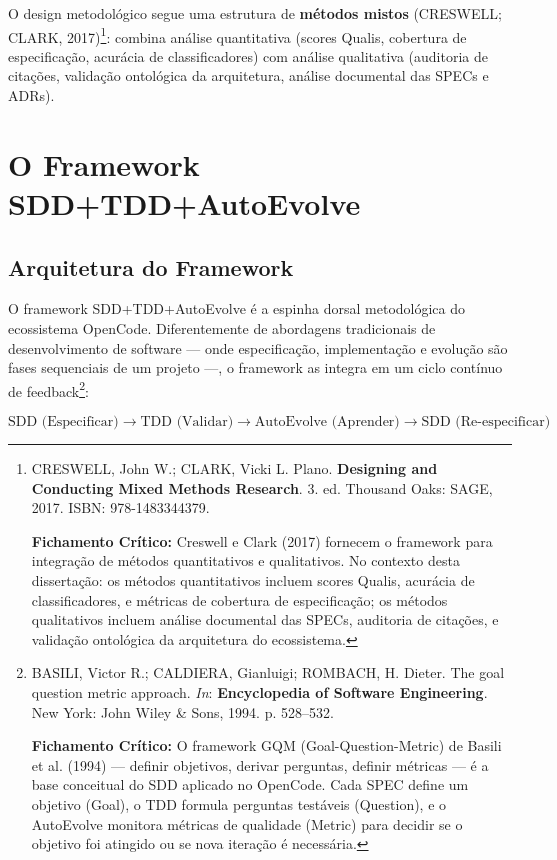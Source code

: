 O design metodológico segue uma estrutura de \textbf{métodos mistos} (CRESWELL; CLARK, 2017)\footnote{
  CRESWELL, John W.; CLARK, Vicki L. Plano. \textbf{Designing and Conducting Mixed Methods Research}. 3. ed. Thousand Oaks: SAGE, 2017. ISBN: 978-1483344379.

  \textbf{Fichamento Crítico:} Creswell e Clark (2017) fornecem o framework para integração de métodos quantitativos e qualitativos. No contexto desta dissertação: os métodos quantitativos incluem scores Qualis, acurácia de classificadores, e métricas de cobertura de especificação; os métodos qualitativos incluem análise documental das SPECs, auditoria de citações, e validação ontológica da arquitetura do ecossistema.
}: combina análise quantitativa (scores Qualis, cobertura de especificação, acurácia de classificadores) com análise qualitativa (auditoria de citações, validação ontológica da arquitetura, análise documental das SPECs e ADRs).

\section{O Framework SDD+\-TDD+\-Auto\-Evolve}

\subsection{Arquitetura do Framework}

O framework SDD+\-TDD+\-Auto\-Evolve é a espinha dorsal metodológica do ecossistema OpenCode. Diferentemente de abordagens tradicionais de desenvolvimento de software --- onde especificação, implementação e evolução são fases sequenciais de um projeto ---, o framework as integra em um ciclo contínuo de feedback\footnote{
  BASILI, Victor R.; CALDIERA, Gianluigi; ROMBACH, H. Dieter. The goal question metric approach. \textit{In}: \textbf{Encyclopedia of Software Engineering}. New York: John Wiley \& Sons, 1994. p. 528--532.

  \textbf{Fichamento Crítico:} O framework GQM (Goal-Question-Metric) de Basili et al. (1994) --- definir objetivos, derivar perguntas, definir métricas --- é a base conceitual do SDD aplicado no OpenCode. Cada SPEC define um objetivo (Goal), o TDD formula perguntas testáveis (Question), e o AutoEvolve monitora métricas de qualidade (Metric) para decidir se o objetivo foi atingido ou se nova iteração é necessária.
}:

\[
\boxed{\text{SDD (Especificar)} \longrightarrow \text{TDD (Validar)} \longrightarrow \text{AutoEvolve (Aprender)} \longrightarrow \text{SDD (Re-especificar)}}
\]

